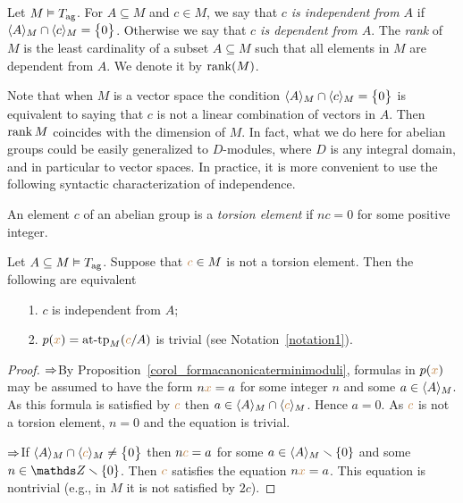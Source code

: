 \begin{definition}\label{def_rank_independece_ag}
  Let $M\models T_{\rm ag}$.
  For $A\subseteq M$ and  $c\in M$, we say that  \emph{$c$ is independent from $A$\/} if $\<A\>_M\cap\<c\>_M=\big\{0\big\}$.
  Otherwise we say that \emph{$c$ is dependent from $A$}.
  The \emph{rank\/} of $M$ is the least cardinality of a subset $A\subseteq M$ such that all elements in $M$ are dependent from $A$.
  We denote it by \emph{$\rank(M)$}.
\end{definition}  

Note that when $M$ is a vector space the condition $\<A\>_M\cap\<c\>_M=\big\{0\big\}$ is equivalent to saying that $c$ is not a linear combination of vectors in $A$.
%
Then $\rank M$ coincides with the dimension of $M$.
%
In fact, what we do here for abelian groups could be easily generalized to $D$-modules, where $D$ is any integral domain, and in particular to vector spaces.
%
In practice, it is more convenient to use the following syntactic characterization of independence.

An element $c$ of an abelian group is a \emph{torsion element} if $nc=0$ for some positive integer.

\begin{proposition}\label{prop_trivial_type_in_ag}
  Let $A\subseteq M\models T_{\rm ag}$.
  Suppose that ${\mr c}\in M$ is not a torsion element.
  Then the following are equivalent
  \begin{itemize}
  \item[1.] $c$ is independent from $A$;
  \item[2.] $p({\mr x})=\attp_M({\mr c}/A)$ is trivial (see Notation~\ref{notation1}).
  \end{itemize}
\end{proposition}
\begin{proof}
  $\IMP$\quad By Proposition~\ref{corol_formacanonicaterminimoduli}, formulas in $p({\mr x})$ may be assumed to have the form $n{\mr x}=a$ for some integer $n$ and some $a\in\<A\>_M$.
  As this formula is satisfied by ${\mr c}$ then $a\in\<A\>_M\cap\<{\mr c}\>_M$.
  Hence $a=0$.
  As ${\mr c}$ is not a torsion element, $n=0$ and the equation is trivial.

  $\IMP$\quad If $\<A\>_M\cap\<{\mr c}\>_M\neq\big\{0\big\}$ then $n{\mr c}=a$ for some $a\in\<A\>_M\sm\{0\}$ and some $n\in\ZZ\sm\{0\}$.
  Then ${\mr c}$ satisfies the equation $n{\mr x}=a$.
  This equation is nontrivial (e.g., in $M$ it is not satisfied by $2c$).

\end{proof}

